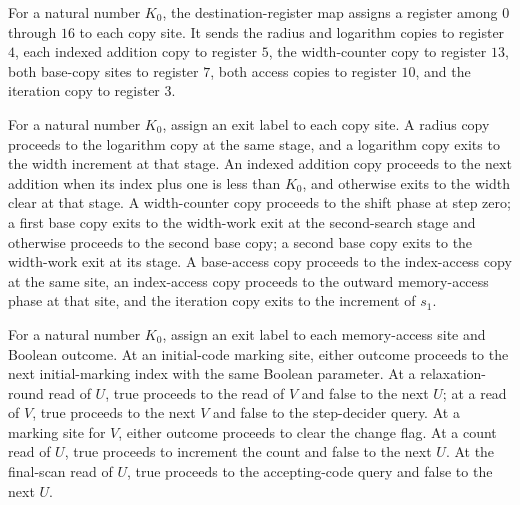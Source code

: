 \begin{definition}
\label{Complexity.LogProg.ExpBFS.cpDst}
\leanok
{}
For a natural number $K_0$, the destination-register map assigns a register among $0$
through $16$ to each copy site. It sends the radius and logarithm copies to register
$4$, each indexed addition copy to register $5$, the width-counter copy to register
$13$, both base-copy sites to register $7$, both access copies to register $10$, and the
iteration copy to register $3$.
\end{definition}

\begin{definition}
\label{Complexity.LogProg.ExpBFS.cpExit}
\leanok
{}
For a natural number $K_0$, assign an exit label to each copy site. A radius copy
proceeds to the logarithm copy at the same stage, and a logarithm copy exits to the
width increment at that stage. An indexed addition copy proceeds to the next addition
when its index plus one is less than $K_0$, and otherwise exits to the width clear at
that stage. A width-counter copy proceeds to the shift phase at step zero; a first base
copy exits to the width-work exit at the second-search stage and otherwise proceeds to
the second base copy; a second base copy exits to the width-work exit at its stage. A
base-access copy proceeds to the index-access copy at the same site, an index-access
copy proceeds to the outward memory-access phase at that site, and the iteration copy
exits to the increment of $s_1$.
\end{definition}

\begin{definition}
\label{Complexity.LogProg.ExpBFS.acExit}
\leanok
{}
For a natural number $K_0$, assign an exit label to each memory-access site and Boolean
outcome. At an initial-code marking site, either outcome proceeds to the next
initial-marking index with the same Boolean parameter. At a relaxation-round read of
$U$, true proceeds to the read of $V$ and false to the next $U$; at a read of $V$, true
proceeds to the next $V$ and false to the step-decider query. At a marking site for $V$,
either outcome proceeds to clear the change flag. At a count read of $U$, true proceeds
to increment the count and false to the next $U$. At the final-scan read of $U$, true
proceeds to the accepting-code query and false to the next $U$.
\end{definition}

